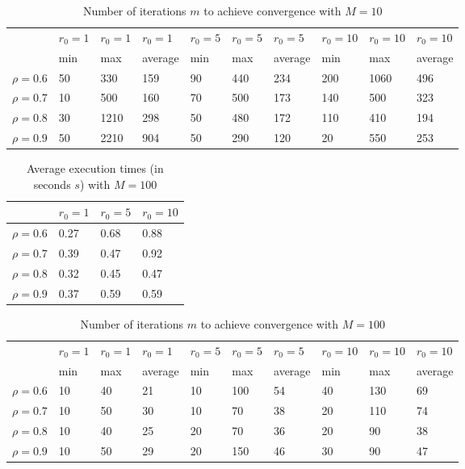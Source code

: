 \documentclass[a4paper,11pt,openright]{report}
\begin{document}
\begin{table}[H]
\centering
\addtolength{\leftskip}{-1.5cm}
\addtolength{\rightskip}{-1.5cm}
\begin{tabular}{|c|lllllllll|}
\hline
$ $ & $r_0 = 1$ & $r_0 = 1$ & $r_0 = 1$ & $r_0 = 5$ & $r_0 = 5$ & $r_0 = 5$ & $r_0 = 10$ & $r_0 = 10$ & $r_0 = 10$  \\
$ $ & min & max & average & min & max & average & min & max & average \\ 
\hline
$\rho = 0.6$ & 50 & 330 & 159 & 90 & 440 & 234 & 200 & 1060 & 496 \\

$\rho = 0.7$ & 10 & 500 & 160 & 70 & 500 & 173 & 140 & 500 & 323\\

$\rho = 0.8$ & 30 & 1210 & 298 & 50 & 480 & 172 & 110 & 410 & 194\\

$\rho = 0.9$ & 50 & 2210 & 904 & 50 & 290 & 120 & 20 & 550 & 253\\
\hline
\end{tabular}
\caption{Number of iterations $m$ to achieve convergence with $M = 10$}
\end{table}
\begin{table}[H]
\centering
\addtolength{\leftskip}{-1.5cm}
\addtolength{\rightskip}{-1.5cm}
\begin{tabular}{|c|lll|}
\hline
$ $ & $r_0 = 1$ & $r_0 = 5$ & $r_0 = 10$ \\
\hline
$\rho = 0.6$ & 0.27 & 0.68 & 0.88 \\

$\rho = 0.7$ & 0.39 & 0.47 & 0.92 \\

$\rho = 0.8$ & 0.32 & 0.45 & 0.47 \\

$\rho = 0.9$ & 0.37 & 0.59 &  0.59 \\
\hline
\end{tabular}
\caption{Average execution
 times (in seconds $s$) with $M = 100$}
\end{table}
\begin{table}[H]
\centering
\addtolength{\leftskip}{-1.5cm}
\addtolength{\rightskip}{-1.5cm}
\begin{tabular}{|c|lllllllll|}
\hline
$ $ & $r_0 = 1$ & $r_0 = 1$ & $r_0 = 1$ & $r_0 = 5$ & $r_0 = 5$ & $r_0 = 5$ & $r_0 = 10$ & $r_0 = 10$ & $r_0 = 10$  \\
$ $ & min & max & average & min & max & average & min & max & average \\ 
\hline
$\rho = 0.6$ & 10 & 40 & 21 & 10 & 100 & 54 & 40 & 130 & 69 \\

$\rho = 0.7$ & 10 & 50 & 30 & 10 & 70 & 38 & 20 & 110 & 74\\

$\rho = 0.8$ & 10 & 40 & 25 & 20 & 70 & 36 & 20 & 90 & 38\\

$\rho = 0.9$ & 10 & 50 & 29 & 20 & 150 & 46 & 30 & 90 & 47\\
\hline
\end{tabular}
\caption{Number of iterations $m$ to achieve convergence with $M = 100$}
\end{table}
\end{document}

